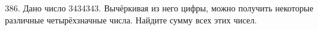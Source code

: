 386. Дано число 3434343. Вычёркивая из него цифры, можно получить некоторые различные четырёхзначные числа. Найдите сумму всех этих чисел.\\
